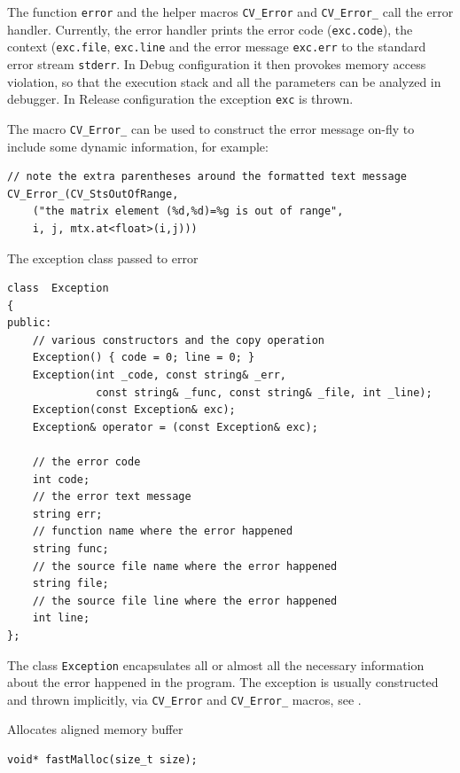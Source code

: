 The function \texttt{error} and the helper macros \texttt{CV\_Error} and \texttt{CV\_Error\_} call the error handler. Currently, the error handler prints the error code (\texttt{exc.code}), the context (\texttt{exc.file}, \texttt{exc.line} and the error message \texttt{exc.err} to the standard error stream \texttt{stderr}. In Debug configuration it then provokes memory access violation, so that the execution stack and all the parameters can be analyzed in debugger. In Release configuration the exception \texttt{exc} is thrown.

The macro \texttt{CV\_Error\_} can be used to construct the error message on-fly to include some dynamic information, for example:

\begin{lstlisting}
// note the extra parentheses around the formatted text message
CV_Error_(CV_StsOutOfRange,
    ("the matrix element (%d,%d)=%g is out of range",
    i, j, mtx.at<float>(i,j)))
\end{lstlisting}


\label{Exception}
The exception class passed to error

\begin{lstlisting}
class  Exception
{
public:
    // various constructors and the copy operation
    Exception() { code = 0; line = 0; }
    Exception(int _code, const string& _err,
              const string& _func, const string& _file, int _line);
    Exception(const Exception& exc);
    Exception& operator = (const Exception& exc);

    // the error code
    int code;
    // the error text message
    string err;
    // function name where the error happened
    string func;
    // the source file name where the error happened
    string file;
    // the source file line where the error happened
    int line;
};
\end{lstlisting}

The class \texttt{Exception} encapsulates all or almost all the necessary information about the error happened in the program. The exception is usually constructed and thrown implicitly, via \texttt{CV\_Error} and \texttt{CV\_Error\_} macros, see .


\label{fastMalloc}
Allocates aligned memory buffer

\begin{lstlisting}
void* fastMalloc(size_t size);
\end{lstlisting}
\begin{description}
\end{description}
 

